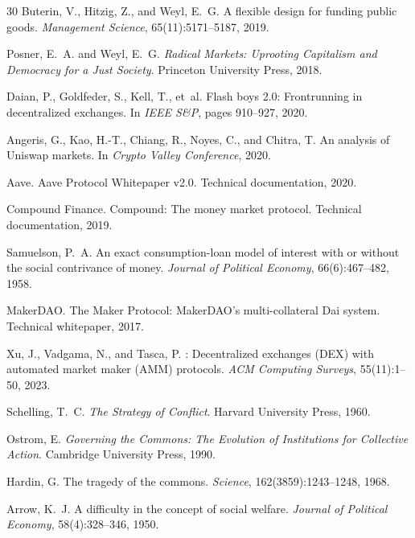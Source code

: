 \documentclass[11pt,a4paper]{article}
\begin{document}
\begin{thebibliography}{30}
Buterin, V., Hitzig, Z., and Weyl, E.~G.
\newblock A flexible design for funding public goods.
\newblock \emph{Management Science}, 65(11):5171--5187, 2019.

Posner, E.~A. and Weyl, E.~G.
\newblock \emph{Radical Markets: Uprooting Capitalism and Democracy for a Just Society}.
\newblock Princeton University Press, 2018.

Daian, P., Goldfeder, S., Kell, T., et~al.
\newblock Flash boys 2.0: Frontrunning in decentralized exchanges.
\newblock In \emph{IEEE S\&P}, pages 910--927, 2020.

Angeris, G., Kao, H.-T., Chiang, R., Noyes, C., and Chitra, T.
\newblock An analysis of {Uniswap} markets.
\newblock In \emph{Crypto Valley Conference}, 2020.

Aave.
\newblock Aave Protocol Whitepaper v2.0.
\newblock Technical documentation, 2020.

Compound Finance.
\newblock Compound: The money market protocol.
\newblock Technical documentation, 2019.

Samuelson, P.~A.
\newblock An exact consumption-loan model of interest with or without the social contrivance of money.
\newblock \emph{Journal of Political Economy}, 66(6):467--482, 1958.

MakerDAO.
\newblock The {Maker} Protocol: {MakerDAO}'s multi-collateral {Dai} system.
\newblock Technical whitepaper, 2017.

Xu, J., Vadgama, N., and Tasca, P.
: Decentralized exchanges ({DEX}) with automated market maker ({AMM}) protocols.
\newblock \emph{ACM Computing Surveys}, 55(11):1--50, 2023.

Schelling, T.~C.
\newblock \emph{The Strategy of Conflict}.
\newblock Harvard University Press, 1960.

Ostrom, E.
\newblock \emph{Governing the Commons: The Evolution of Institutions for Collective Action}.
\newblock Cambridge University Press, 1990.

Hardin, G.
\newblock The tragedy of the commons.
\newblock \emph{Science}, 162(3859):1243--1248, 1968.

Arrow, K.~J.
\newblock A difficulty in the concept of social welfare.
\newblock \emph{Journal of Political Economy}, 58(4):328--346, 1950.

\end{thebibliography}
\end{document}
